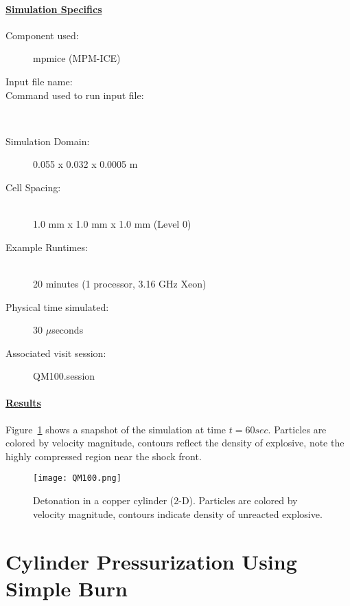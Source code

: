 \paragraph*{\underline{Simulation Specifics}}
\begin{description}
\item [Component used:] \hfill mpmice (MPM-ICE)
\item [Input file name:] \hfill {}
\item [Command used to run input file:]\hfill \\

\item [Simulation Domain:]\hfill    0.055 x 0.032 x 0.0005 m

\item [Cell Spacing:]\hfill \\
1.0 mm x 1.0 mm x 1.0 mm (Level 0)

\item [Example Runtimes:] \hfill \\
 20 minutes   (1 processor, 3.16 GHz Xeon)\\

\item [Physical time simulated:] \hfill 30 $\mu$seconds

\item [Associated visit session:] \hfill QM100.session

\end{description}

\paragraph*{\underline{Results}}

Figure~\ref{fig:QM100} shows a snapshot of the simulation at time $t=60sec$.
Particles are colored by velocity magnitude, contours reflect the density of
explosive, note the highly compressed region near the shock front.
\begin{figure}
  \center
  \texttt{[image: QM100.png]}
  \caption{Detonation in a copper cylinder (2-D).  Particles are colored by
           velocity magnitude, contours indicate density of unreacted
           explosive.}
  \label{fig:QM100}
\end{figure}
%
\newpage

\section*{\center  Cylinder Pressurization Using Simple Burn}
